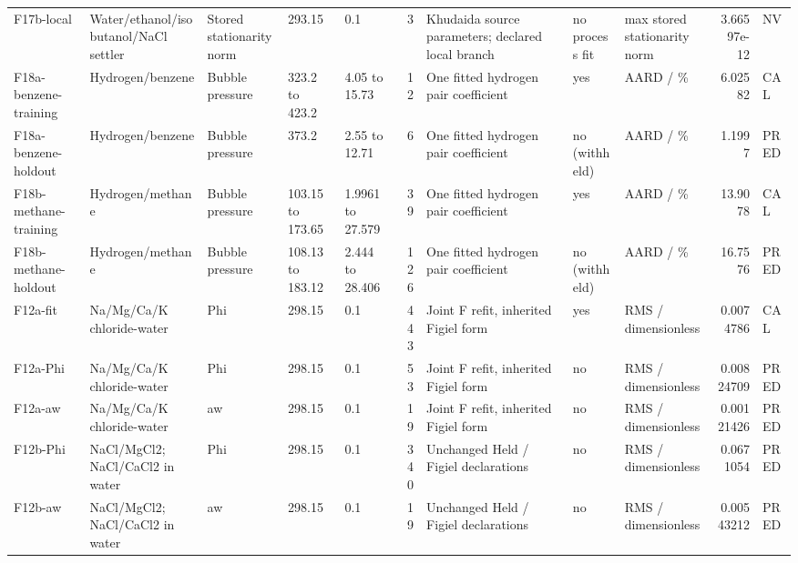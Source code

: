 \begin{landscape}
\begin{longtable}{L{1.9cm}L{2.5cm}L{2.1cm}L{1.6cm}L{1.6cm}rL{2.4cm}L{1.9cm}L{2.2cm}rL{1cm}}
F17b-\allowbreak{}local & Water/\allowbreak{}ethanol/\allowbreak{}isobutanol/\allowbreak{}NaCl settler & Stored stationarity norm & 293.15 & 0.1 & 3 & Khudaida source parameters; declared local branch & no process fit & max stored stationarity norm & 3.66597e-\allowbreak{}12 & NV \\
F18a-\allowbreak{}benzene-\allowbreak{}training & Hydrogen/\allowbreak{}benzene & Bubble pressure & 323.2 to 423.2 & 4.05 to 15.73 & 12 & One fitted hydrogen pair coefficient & yes & AARD /\allowbreak{} \% & 6.02582 & CAL \\
F18a-\allowbreak{}benzene-\allowbreak{}holdout & Hydrogen/\allowbreak{}benzene & Bubble pressure & 373.2 & 2.55 to 12.71 & 6 & One fitted hydrogen pair coefficient & no (withheld) & AARD /\allowbreak{} \% & 1.1997 & PRED \\
F18b-\allowbreak{}methane-\allowbreak{}training & Hydrogen/\allowbreak{}methane & Bubble pressure & 103.15 to 173.65 & 1.9961 to 27.579 & 39 & One fitted hydrogen pair coefficient & yes & AARD /\allowbreak{} \% & 13.9078 & CAL \\
F18b-\allowbreak{}methane-\allowbreak{}holdout & Hydrogen/\allowbreak{}methane & Bubble pressure & 108.13 to 183.12 & 2.444 to 28.406 & 126 & One fitted hydrogen pair coefficient & no (withheld) & AARD /\allowbreak{} \% & 16.7576 & PRED \\
F12a-\allowbreak{}fit & Na/\allowbreak{}Mg/\allowbreak{}Ca/\allowbreak{}K chloride-\allowbreak{}water & Phi & 298.15 & 0.1 & 443 & Joint F refit, inherited Figiel form & yes & RMS /\allowbreak{} dimensionless & 0.0074786 & CAL \\
F12a-\allowbreak{}Phi & Na/\allowbreak{}Mg/\allowbreak{}Ca/\allowbreak{}K chloride-\allowbreak{}water & Phi & 298.15 & 0.1 & 53 & Joint F refit, inherited Figiel form & no & RMS /\allowbreak{} dimensionless & 0.00824709 & PRED \\
F12a-\allowbreak{}aw & Na/\allowbreak{}Mg/\allowbreak{}Ca/\allowbreak{}K chloride-\allowbreak{}water & aw & 298.15 & 0.1 & 19 & Joint F refit, inherited Figiel form & no & RMS /\allowbreak{} dimensionless & 0.00121426 & PRED \\
F12b-\allowbreak{}Phi & NaCl/\allowbreak{}MgCl2; NaCl/\allowbreak{}CaCl2 in water & Phi & 298.15 & 0.1 & 340 & Unchanged Held /\allowbreak{} Figiel declarations & no & RMS /\allowbreak{} dimensionless & 0.0671054 & PRED \\
F12b-\allowbreak{}aw & NaCl/\allowbreak{}MgCl2; NaCl/\allowbreak{}CaCl2 in water & aw & 298.15 & 0.1 & 19 & Unchanged Held /\allowbreak{} Figiel declarations & no & RMS /\allowbreak{} dimensionless & 0.00543212 & PRED \\

\end{longtable}
\end{landscape}

